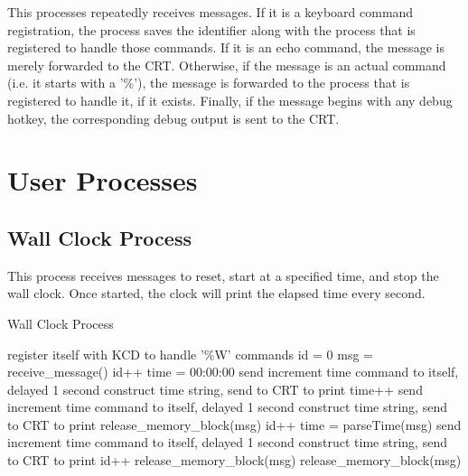 \documentclass[12pt]{report}
\begin{document}
This processes repeatedly receives messages. If it is a keyboard command registration, the process saves the identifier along with the process that is registered to handle those commands. If it is an echo command, the message is merely forwarded to the CRT. Otherwise, if the message is an actual command (i.e. it starts with a '\%'), the message is forwarded to the process that is registered to handle it, if it exists. Finally, if the message begins with any debug hotkey, the corresponding debug output is sent to the CRT.


\section{User Processes}

\subsection{Wall Clock Process}

This process receives messages to reset, start at a specified time, and stop the wall clock. Once started, the clock will print the elapsed time every second.

\begin{algorithm}[H]
	\caption{Wall Clock Process}
	\begin{algorithmic}[1]
	    \State register itself with KCD to handle '\%W' commands
	    \State id = 0
	    \texttt{}
	      \State msg = receive\_message()
	        \State id++
	        \State time = 00:00:00
	        \State send increment time command to itself, delayed 1 second
	        \State construct time string, send to CRT to print
	          \State time++
	          \State send increment time command to itself, delayed 1 second
	          \State construct time string, send to CRT to print
	        \Else
	          \State release\_memory\_block(msg)
	        \EndIf
	        \State id++
	        \State time = parseTime(msg)
	        \State send increment time command to itself, delayed 1 second
	        \State construct time string, send to CRT to print
	        \State id++
	        \State release\_memory\_block(msg)
	      \Else
	        \State release\_memory\_block(msg)
	      \EndIf
	    \EndWhile
	  \EndFunction
	\end{algorithmic}
\end{algorithm}
\end{document}
